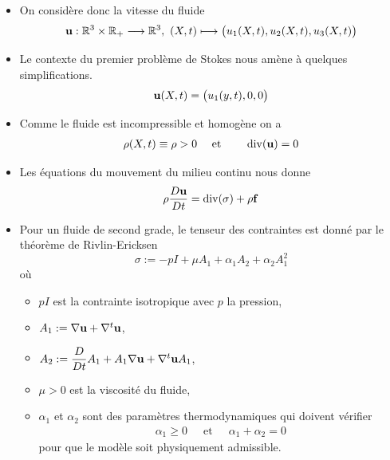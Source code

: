\begin{frame}
\begin{itemize}
\item On considère donc la vitesse du fluide
\begin{eqnarray*}
    \bm{\mathrm{u}} : \mathbb{R}^3 \times \mathbb{R}_+ \longrightarrow \mathbb{R}^3, \
    (X,t) \longmapsto \big(u_1(X,t), u_2(X,t), u_3(X,t)\big)
\end{eqnarray*} 
\item Le contexte du premier problème de Stokes nous amène à quelques 
simplifications. 
\begin{equation*}
    \bm{\mathrm{u}} (X,t) = \big(u_1(y,t),0,0\big)
\end{equation*} 
\item Comme le fluide est incompressible et homogène on a 
\begin{eqnarray*}
    \rho(X,t) \equiv \rho > 0 \ \ \ &\text{ et }& \ \ \ \Div(\bfm{u})=0
\end{eqnarray*} 
\item Les équations du mouvement du milieu continu nous donne 
\begin{equation}\label{PFD1}
    \rho \frac{D\bm{\mathrm{u}}}{Dt} = \mathrm{div}(\sigma) + \rho \bm{\mathrm{f}}
\end{equation}
\end{itemize}
\end{frame}

\begin{frame}
\begin{itemize}
    \item Pour un fluide de second grade, le tenseur des contraintes est 
donné par le théorème de Rivlin-Ericksen 
\begin{equation*}
    \sigma := -pI + \mu A_1 + \alpha_1 A_2 + \alpha_2 A_1^2
\end{equation*}
où
\begin{itemize}
    \item[$\triangleright$] $pI$ est la contrainte isotropique avec $p$ la pression,
    \item[$\triangleright$] $A_1 := \nabla \bm{\mathrm{u}} + \nabla^t \bm{\mathrm{u}}$,
    \item[$\triangleright$] $A_2 := \dfrac{D}{Dt}A_1 + A_1\nabla \bm{\mathrm{u}} + \nabla^t\bm{\mathrm{u}} A_1$,
    \item[$\triangleright$] $\mu >0$ est la viscosité du fluide,
    \item[$\triangleright$] $\alpha_1$ et $\alpha_2$ sont des paramètres thermodynamiques qui doivent vérifier 
    \begin{eqnarray*}
        \alpha_1 \geq 0 \ \ \ \ \ \text{ et } \ \ \ \ \ \alpha_1 + \alpha_2 = 0
    \end{eqnarray*}
    pour que le modèle soit physiquement admissible.
\end{itemize}
\end{itemize}
\end{frame}

